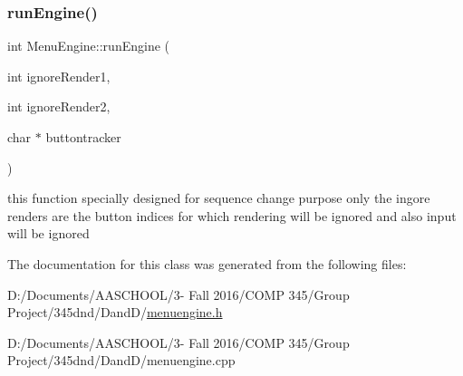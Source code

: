 \subsubsection{\texorpdfstring{run\+Engine()}{runEngine()}\hspace{0.1cm}{\footnotesize\ttfamily [2/2]}}
{\footnotesize\ttfamily int Menu\+Engine\+::run\+Engine (\begin{DoxyParamCaption}\item[{int}]{ignore\+Render1,  }\item[{int}]{ignore\+Render2,  }\item[{char $\ast$}]{buttontracker }\end{DoxyParamCaption})}

this function specially designed for sequence change purpose only the ingore renders are the button indices for which rendering will be ignored and also input will be ignored 

The documentation for this class was generated from the following files\+:\begin{DoxyCompactItemize}
\item 
D\+:/\+Documents/\+A\+A\+S\+C\+H\+O\+O\+L/3-\/ Fall 2016/\+C\+O\+M\+P 345/\+Group Project/345dnd/\+Dand\+D/\hyperlink{menuengine_8h}{menuengine.\+h}\item 
D\+:/\+Documents/\+A\+A\+S\+C\+H\+O\+O\+L/3-\/ Fall 2016/\+C\+O\+M\+P 345/\+Group Project/345dnd/\+Dand\+D/menuengine.\+cpp\end{DoxyCompactItemize}
